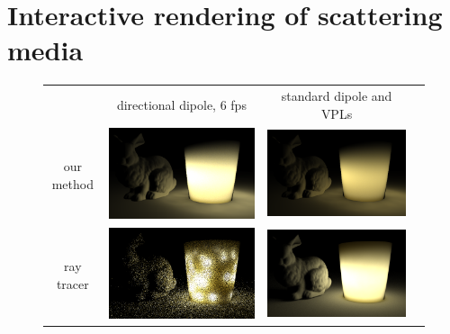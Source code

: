 \section{Interactive rendering of scattering media}
\begin{figure}
\begin{tabular}{@{}c@{$\,$}c@{}c@{}c@{}}
& directional dipole, 6 fps & standard dipole and VPLs \\
\begin{sideways}\hspace*{1.5em}our method\end{sideways} &
\includegraphics[width=0.48\columnwidth]{figures/candle_holder_directional_6fps.png} &
\includegraphics[width=0.48\columnwidth]{figures/candle_holder_jensen_converged.png} \\[-4pt]
\begin{sideways}\hspace*{1.7em}ray tracer\end{sideways} &
\includegraphics[width=0.48\columnwidth]{figures/scene_comparison_optix_6fps.png} &
\includegraphics[width=0.48\columnwidth]{figures/scene_comparison_converged.png} \\[-0.5ex]

\end{tabular}
\end{figure}

